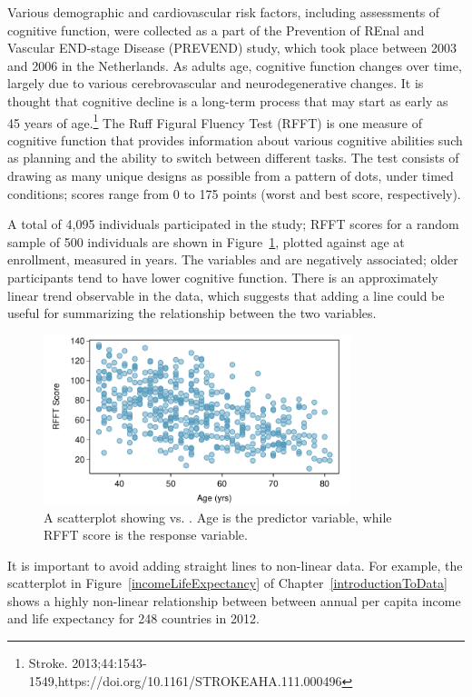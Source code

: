 Various demographic and cardiovascular risk factors, including assessments of cognitive function, were collected as a part of the Prevention of REnal and Vascular END-stage Disease (PREVEND) study, which took place between 2003 and 2006 in the Netherlands. As adults age, cognitive function changes over time, largely due to various cerebrovascular and neurodegenerative changes. It is thought that cognitive decline is a long-term process that may start as early as 45 years of age.\footnote{Stroke. 2013;44:1543-1549,https://doi.org/10.1161/STROKEAHA.111.000496 } The Ruff Figural Fluency Test (RFFT) is one measure of cognitive function that provides information about various cognitive abilities such as planning and the ability to switch between different tasks. The test consists of drawing as many unique designs as possible from a pattern of dots, under timed conditions; scores range from 0 to 175 points (worst and best score, respectively).

A total of 4,095 individuals participated in the study; RFFT scores for a random sample of 500 individuals are shown in Figure~\ref{statinsAgeRFFT}, plotted against age at enrollment, measured in years. The variables  and  are negatively associated; older participants tend to have lower cognitive function. There is an approximately linear trend observable in the data, which suggests that adding a line could be useful for summarizing the relationship between the two variables.

\begin{figure}[h!]
	\centering
	\includegraphics[width=0.8\textwidth]
	{ch_simple_linear_regression_oi_biostat/figures/statinsAgeRFFTPlot/statinsAgeRFFTPlot}
	\caption{A scatterplot showing  vs. . Age is the predictor variable, while RFFT score is the response variable.}
	\label{statinsAgeRFFT}
\end{figure}

It is important to avoid adding straight lines to non-linear data. For example, the scatterplot in Figure~\ref{incomeLifeExpectancy} of Chapter~\ref{introductionToData} shows a highly non-linear relationship between between annual per capita income and life expectancy for 248 countries in 2012.

